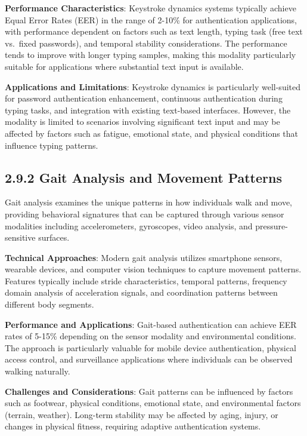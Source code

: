 \documentclass[
  12pt,
  a4paper,
]{report}
\begin{document}
\textbf{Performance Characteristics}: Keystroke dynamics systems
typically achieve Equal Error Rates (EER) in the range of 2-10\% for
authentication applications, with performance dependent on factors such
as text length, typing task (free text vs.~fixed passwords), and
temporal stability considerations. The performance tends to improve with
longer typing samples, making this modality particularly suitable for
applications where substantial text input is available.

\textbf{Applications and Limitations}: Keystroke dynamics is
particularly well-suited for password authentication enhancement,
continuous authentication during typing tasks, and integration with
existing text-based interfaces. However, the modality is limited to
scenarios involving significant text input and may be affected by
factors such as fatigue, emotional state, and physical conditions that
influence typing patterns.

\subsection{2.9.2 Gait Analysis and Movement
Patterns}\label{gait-analysis-and-movement-patterns}

Gait analysis examines the unique patterns in how individuals walk and
move, providing behavioral signatures that can be captured through
various sensor modalities including accelerometers, gyroscopes, video
analysis, and pressure-sensitive surfaces.

\textbf{Technical Approaches}: Modern gait analysis utilizes smartphone
sensors, wearable devices, and computer vision techniques to capture
movement patterns. Features typically include stride characteristics,
temporal patterns, frequency domain analysis of acceleration signals,
and coordination patterns between different body segments.

\textbf{Performance and Applications}: Gait-based authentication can
achieve EER rates of 5-15\% depending on the sensor modality and
environmental conditions. The approach is particularly valuable for
mobile device authentication, physical access control, and surveillance
applications where individuals can be observed walking naturally.

\textbf{Challenges and Considerations}: Gait patterns can be influenced
by factors such as footwear, physical conditions, emotional state, and
environmental factors (terrain, weather). Long-term stability may be
affected by aging, injury, or changes in physical fitness, requiring
adaptive authentication systems.
\end{document}
